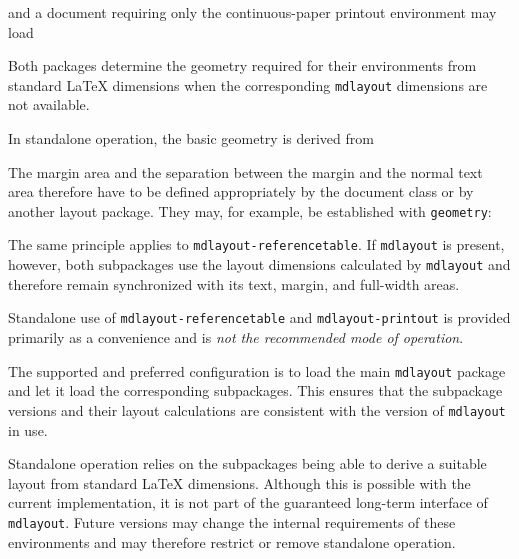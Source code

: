 \documentclass[
11pt,
a4paper,
oneside
]{scrbook}
\begin{document}



and a document requiring only the continuous-paper printout environment may
load






Both packages determine the geometry required for their environments from
standard \LaTeX{} dimensions when the corresponding \texttt{mdlayout}
dimensions are not available.

In standalone operation, the basic geometry is derived from






The margin area and the separation between the margin and the normal text area
therefore have to be defined appropriately by the document class or by another
layout package. They may, for example, be established with \texttt{geometry}:






The same principle applies to \texttt{mdlayout-referencetable}. If
\texttt{mdlayout} is present, however, both subpackages use the layout
dimensions calculated by \texttt{mdlayout} and therefore remain synchronized
with its text, margin, and full-width areas.

\begin{note}
	Standalone use of \texttt{mdlayout-referencetable} and
	\texttt{mdlayout-printout} is provided primarily as a convenience and is
	\emph{not the recommended mode of operation}.
	
	The supported and preferred configuration is to load the main
	\texttt{mdlayout} package and let it load the corresponding subpackages.
	This ensures that the subpackage versions and their layout calculations are
	consistent with the version of \texttt{mdlayout} in use.
	
	Standalone operation relies on the subpackages being able to derive a
	suitable layout from standard \LaTeX{} dimensions. Although this is possible
	with the current implementation, it is not part of the guaranteed long-term
	interface of \texttt{mdlayout}. Future versions may change the internal
	requirements of these environments and may therefore restrict or remove
	standalone operation.
\end{note}
\end{document}

